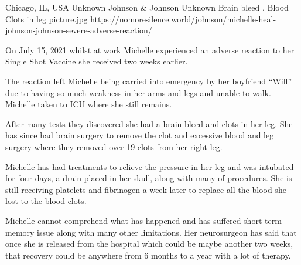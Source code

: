 {Chicago, IL, USA}
{Unknown}
{Johnson \& Johnson }
{Unknown}
{Brain bleed , Blood Clots in leg}
{picture.jpg}
{https://nomoresilence.world/johnson/michelle-heal-johnson-johnson-severe-adverse-reaction/}
{

On July 15, 2021 whilst at work Michelle experienced an adverse reaction to her
Single Shot Vaccine she received two weeks earlier.

The reaction left Michelle being carried into emergency by her boyfriend “Will”
due to having so much weakness in her arms and legs and unable to walk. Michelle
taken to ICU where she still remains.

After many tests they discovered she had a brain bleed and clots in her leg. She
has since had brain surgery to remove the clot and excessive blood and leg
surgery where they removed over 19 clots from her right leg.

Michelle has had treatments to relieve the pressure in her leg and was intubated
for four days, a drain placed in her skull, along with many of procedures. She
is still receiving platelets and fibrinogen a week later to replace all the
blood she lost to the blood clots.

Michelle cannot comprehend what has happened and has suffered short term memory
issue along with many other limitations. Her neurosurgeon has said that once she
is released from the hospital which could be maybe another two weeks, that
recovery could be anywhere from 6 months to a year with a lot of therapy.

}
